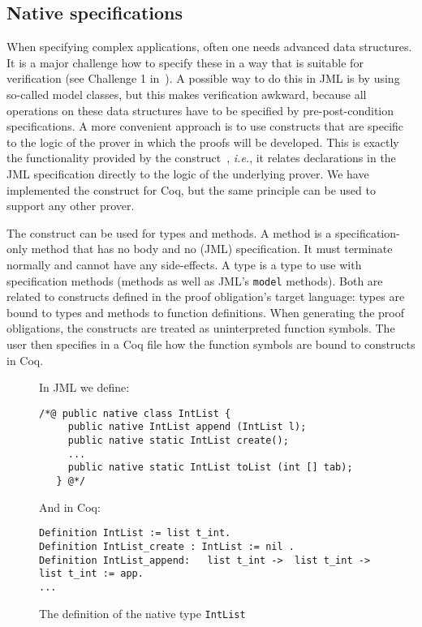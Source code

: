 \subsection{Native specifications}

When specifying complex applications, often one needs advanced data
structures. It is a major challenge how to specify these in a way that
is suitable for verification (see Challenge 1
in~\cite{LeavensLeinoMueller07}). A possible way to do this in JML is
by using so-called model classes, but this makes verification awkward,
because all operations on these data structures have to be specified
by pre-post-condition specifications. A more convenient approach is to
use constructs that are specific to the logic of the prover in which
the proofs will be developed. This is exactly the functionality
provided by the \native construct~\cite{Charles06},
\emph{i.e.}, it relates declarations in the JML specification directly
to the logic of the underlying prover. We have implemented the \native
construct for Coq, but the same principle can be used to support any
other prover.

The \native construct can be used for types and methods.  A \native
method is a specification-only method that has no body and no (JML)
specification. It must terminate normally and cannot have any
side-effects. A \native type is a type to use with specification
methods (\native methods as well as JML's {\tt model} methods). Both
are related to constructs defined in the proof obligation's target
language: \native types are bound to types and \native methods to
function definitions. When generating the proof obligations, the
\native constructs are treated as uninterpreted function symbols. The
user then specifies in a Coq file how the function symbols are bound
to constructs in Coq. 


\begin{figure}[t!]
{\small In JML we define:
\begin{verbatim}
/*@ public native class IntList {
     public native IntList append (IntList l);
     public native static IntList create();
     ...
     public native static IntList toList (int [] tab);
   } @*/ \end{verbatim}

And in Coq:
\begin{verbatim}
Definition IntList := list t_int.
Definition IntList_create : IntList := nil .  
Definition IntList_append:   list t_int ->  list t_int -> list t_int := app.
... \end{verbatim}}
\caption{The definition of the native type \texttt{IntList}}\label{CoqAnnot} 
\end{figure}

